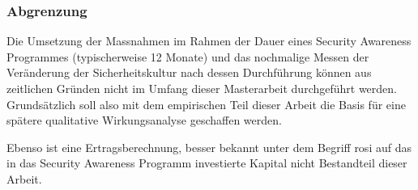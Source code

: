 \documentclass[../../main.tex]{subfiles}
\begin{document}
\subsubsection*{Abgrenzung}

\begin{sloppypar}
Die Umsetzung der Massnahmen im Rahmen der Dauer eines Security Awareness Programmes (typischerweise 12 Monate) und das nochmalige Messen der Veränderung der Sicherheitskultur nach dessen Durchführung können aus zeitlichen Gründen nicht im Umfang dieser Masterarbeit durchgeführt werden. Grundsätzlich soll also mit dem empirischen Teil dieser Arbeit die Basis für eine spätere qualitative Wirkungsanalyse geschaffen werden.

Ebenso ist eine Ertragsberechnung, besser bekannt unter dem Begriff \acrfull{rosi} auf das in das Security Awareness Programm investierte Kapital nicht Bestandteil dieser Arbeit. 
\end{sloppypar}
\end{document}
